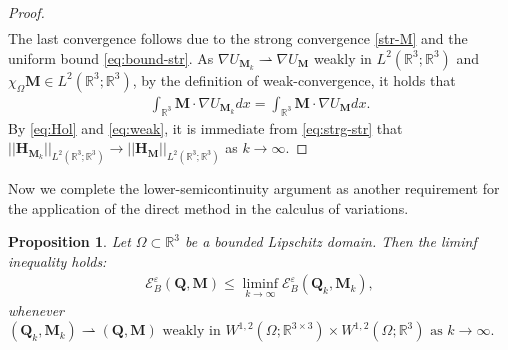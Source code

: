 \documentclass{article}
\newtheorem{proposition}[theorem]{Proposition}
\def\Qvec{\mathbf{Q}}
\def \Mvec{\mathbf{M}}
\def\Hvec{\mathbf{H}}
\begin{document}
\begin{proof}
\begin{eqnarray}
\end{eqnarray}
\noindent The last convergence follows due to the strong convergence \eqref{str-M} and the uniform bound \eqref{eq:bound-str}. As $\nabla U_{\textbf{M}_{k}}\rightharpoonup \nabla U_{\textbf{M}}$ weakly in $L^2\left(\mathbb R^3; \mathbb  R^3\right)$ and $\chi_{\Omega}\Mvec\in L^2\left(\mathbb R^3; \mathbb R^3\right)$, by the definition of weak-convergence, it holds that
\begin{eqnarray}
\int_{\mathbb R^3}\textbf{M}\cdot\nabla U_{\textbf{M}_k}dx = \int_{\mathbb R^3}\textbf{M}\cdot\nabla U_{\textbf{M}}dx.\label{eq:weak}
\end{eqnarray}
By \eqref{eq:Hol} and \eqref{eq:weak}, it is immediate from \eqref{eq:strg-str} that $||\Hvec_{\Mvec_k}||_{L^2\left(\mathbb R^3; \mathbb R^3\right)}\rightarrow ||\Hvec_{\Mvec}||_{L^2\left(\mathbb R^3; \mathbb R^3\right)}$ as $k\rightarrow\infty$.
\end{proof}
Now we complete the lower-semicontinuity argument as another requirement for the application of the direct method in the calculus of variations.
\begin{proposition}\label{prop:wls}
Let $\Omega\subset\mathbb R^3$ be a bounded Lipschitz domain. Then the liminf inequality holds:
\begin{eqnarray}\label{wls1}
\mathcal{E}^{\varepsilon}_B\left(\Qvec, \Mvec\right)\le \liminf_{k\rightarrow\infty} \mathcal{E}^{\varepsilon}_B\left(\Qvec_k, \Mvec_k\right),
\end{eqnarray}whenever $\left(\Qvec_k, \Mvec_k\right)\rightharpoonup \left(\Qvec, \Mvec\right) \mbox{ weakly in } W^{1,2}\left(\Omega; \mathbb{R}^{3\times 3}\right)\times W^{1,2}\left(\Omega; \mathbb R^3\right) \mbox{ as } k\to\infty.$
\end{proposition}
\end{document}
